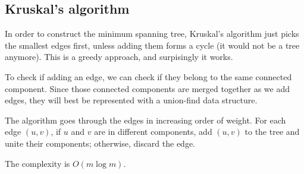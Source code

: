 \subsection{Kruskal's algorithm}

In order to construct the minimum spanning tree, Kruskal's algorithm
just picks the smallest edges first, unless adding them forms a cycle
(it would not be a tree anymore).
This is a greedy approach, and surpisingly it works.

To check if adding an edge, we can check if they belong to the same
connected component.
Since those connected components are merged together as we add edges,
they will best be represented with a union-find data structure.

The algorithm goes through the edges in increasing order of weight.
For each edge $(u,v)$, if $u$ and $v$ are in different components,
add $(u,v)$ to the tree and unite their components;
otherwise, discard the edge.

The complexity is $O(m \log m)$.
